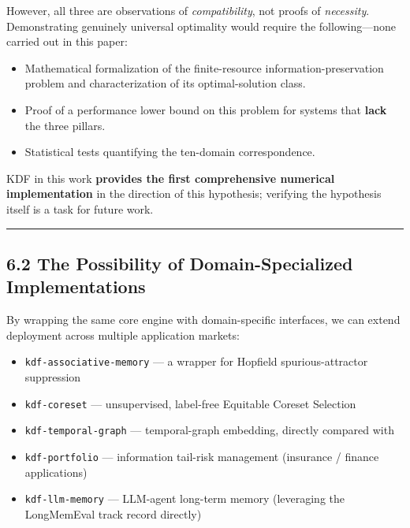 However, all three are observations of \emph{compatibility}, not proofs of \emph{necessity}. Demonstrating genuinely universal optimality would require the following---none carried out in this paper:

\begin{itemize}
\tightlist
\item
  Mathematical formalization of the finite-resource information-preservation problem and characterization of its optimal-solution class.
\item
  Proof of a performance lower bound on this problem for systems that \textbf{lack} the three pillars.
\item
  Statistical tests quantifying the ten-domain correspondence.
\end{itemize}

KDF in this work \textbf{provides the first comprehensive numerical implementation} in the direction of this hypothesis; verifying the hypothesis itself is a task for future work.

\begin{center}\rule{0.5\linewidth}{0.5pt}\end{center}

\subsection{6.2 The Possibility of Domain-Specialized Implementations}\label{the-possibility-of-domain-specialized-implementations}

By wrapping the same core engine with domain-specific interfaces, we can extend deployment across multiple application markets:

\begin{itemize}
\tightlist
\item
  \texttt{kdf-associative-memory} --- a wrapper for Hopfield spurious-attractor suppression
\item
  \texttt{kdf-coreset} --- unsupervised, label-free Equitable Coreset Selection
\item
  \texttt{kdf-temporal-graph} --- temporal-graph embedding, directly compared with \citet{nguyen2018ctdne}
\item
  \texttt{kdf-portfolio} --- information tail-risk management (insurance / finance applications)
\item
  \texttt{kdf-llm-memory} --- LLM-agent long-term memory (leveraging the LongMemEval track record directly)
\end{itemize}

